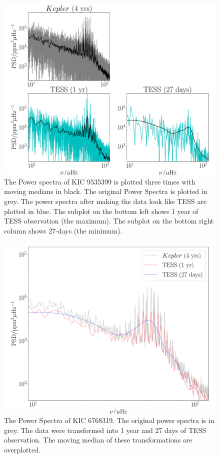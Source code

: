 \documentclass[a4paper,fleqn,usenatbib,useAMS]{mnras}
\begin{document}
\begin{figure}
	\centering
	\includegraphics[scale=0.25]{diagnostic_plot3_modes}
	\caption{The Power spectra of KIC 9535399 is plotted three times with moving medians in black. The original Power Spectra is plotted in grey. The power spectra after making the data look like TESS are plotted in blue. The subplot on the bottom left shows 1 year of TESS observation (the maximum). The subplot on the bottom right column shows 27-days (the minimum).}	
	\label{Power Spectra}
\end{figure} 
\begin{figure}
	\centering
	\includegraphics[scale=0.25]{diagnostic_plot4_modes}
	\caption{The Power Spectra of KIC 6768319. The original power spectra is in grey. The data were transformed into 1 year and 27 days of TESS observation. The moving median of these transformations are overplotted.}	
	\label{overplotted PS}
\end{figure} 
\end{document}
